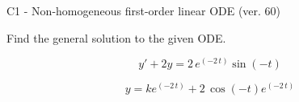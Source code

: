 \begin{exercise}
  \begin{exerciseTitle}C1 - Non-homogeneous first-order linear ODE (ver. 60)\end{exerciseTitle}
  \begin{exerciseStatement}
    
Find the general solution to the given ODE.

    
\[y'+2y= 2 \, e^{\left(-2 \, t\right)} \sin\left(-t\right)\]

  \end{exerciseStatement}
  \begin{exerciseAnswer}
    
\[y= k e^{\left(-2 \, t\right)} + 2 \, \cos\left(-t\right) e^{\left(-2 \, t\right)}\]

  \end{exerciseAnswer}
\end{exercise}